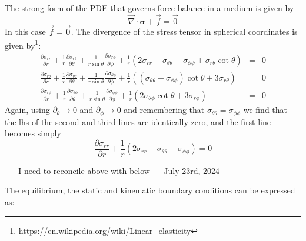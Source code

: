 The strong form of the PDE that governs force balance in a medium is given by
\[
\vec\nabla \cdot {\bm \sigma} + \vec{f} = \vec{0}
\]
In this case $\vec{f}=\vec{0}$.
The divergence of the stress tensor in spherical coordinates is given 
by\footnote{\url{https://en.wikipedia.org/wiki/Linear_elasticity}}:
\begin{eqnarray}
\frac{\partial \sigma_{rr}}{\partial r} + \frac{1}{r} \frac{\partial \sigma_{r\theta}}{\partial \theta}
+\frac{1}{r \sin \theta} \frac{\partial \sigma_{r\phi}}{\partial \phi}
+\frac{1}{r} (2\sigma_{rr} -\sigma_{\theta\theta} -\sigma_{\phi\phi} 
+ \sigma_{r\theta} \cot \theta) &=& 0 
\\
\frac{\partial \sigma_{r\theta}}{\partial r}+
\frac{1}{r}\frac{\partial \sigma_{\theta\theta}}{\partial \theta}+
\frac{1}{r \sin \theta} \frac{\partial \sigma_{\theta\phi}}{\partial \phi}
+\frac{1}{r} \left(
(\sigma_{\theta\theta}-\sigma_{\phi\phi})\cot \theta + 3 \sigma_{r\theta} 
\right)&=& 0 
\\
\frac{\partial \sigma_{r\phi}}{\partial r}+
\frac{1}{r}\frac{\partial \sigma_{\theta\phi}}{\partial \theta}+
\frac{1}{r \sin \theta} \frac{\partial \sigma_{\phi\phi}}{\partial \phi}
+\frac{1}{r} \left(
2\sigma_{\theta\phi} \cot\theta + 3 \sigma_{r\phi}
\right)&=& 0 
\end{eqnarray}
Again, using $\partial_\theta \rightarrow 0$ and $\partial_\phi \rightarrow 0$
and remembering that $\sigma_{\theta\theta}=\sigma_{\phi\phi}$
we find that the lhs of the second and third lines are identically zero,
and the first line becomes simply
\[
\frac{\partial \sigma_{rr}}{\partial r} + 
\frac{1}{r} (2\sigma_{rr} -\sigma_{\theta\theta} -\sigma_{\phi\phi} ) = 0 
\]

---- I need to reconcile above with below --- July 23rd, 2024

The equilibrium, the static and kinematic boundary conditions can be expressed as:


